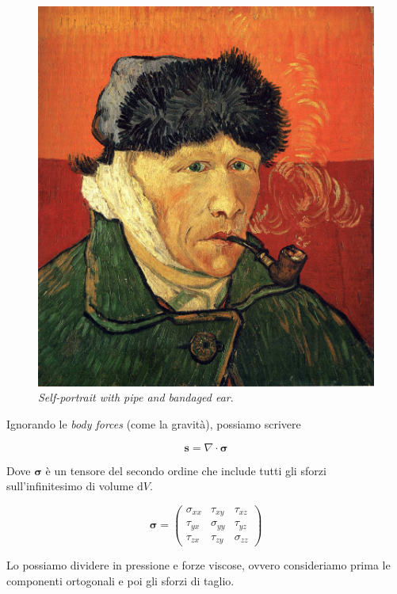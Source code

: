 \documentclass[12pt,a4paper]{article}
\numberwithin{equation}{section}
\begin{document}
\begin{figure}
    \centering
    \includegraphics[scale=0.10]{selfportrait.jpg}
    \caption{\emph{Self-portrait with pipe and bandaged ear}.}
    \label{self}
\end{figure}

Ignorando le \emph{body forces} (come la gravità), possiamo scrivere

\begin{equation}
\mathbf{s} = \nabla \cdot \bm{\sigma}
\end{equation}

Dove $\bm{\sigma}$ è un tensore del secondo ordine che include tutti gli sforzi sull'infinitesimo di volume $\mathrm{d}V$. 

\begin{equation}
\bm{\sigma} = \begin{pmatrix}
\sigma_{xx} &  \tau_{xy} & \tau_{xz} \\
\tau_{yx} &  \sigma_{yy} & \tau_{yz} \\
\tau_{zx} &  \tau_{zy} & \sigma_{zz}
\end{pmatrix}
\end{equation}

Lo possiamo dividere in pressione e forze viscose, ovvero consideriamo prima le componenti ortogonali e poi gli sforzi di taglio.
\end{document}
